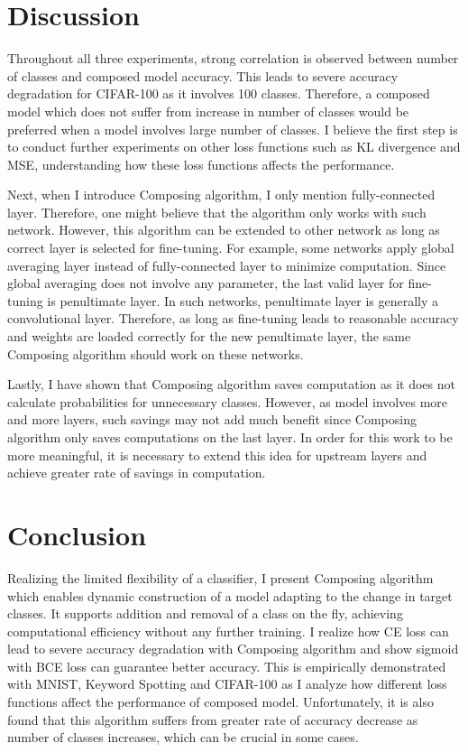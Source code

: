 \documentclass{article}
\begin{document}
\section{Discussion}

Throughout all three experiments, strong correlation is observed between number of classes and composed model accuracy. This leads to severe accuracy degradation for CIFAR-100 as it involves 100 classes. Therefore, a composed model which does not suffer from increase in number of classes would be preferred when a model involves large number of classes. I believe the first step is to conduct further experiments on other loss functions such as KL divergence and MSE, understanding how these loss functions affects the performance.

Next, when I introduce Composing algorithm, I only mention fully-connected layer. Therefore, one might believe that the algorithm only works with such network. However, this algorithm can be extended to other network as long as correct layer is selected for fine-tuning. For example, some networks apply global averaging layer instead of fully-connected layer to minimize computation. Since global averaging does not involve any parameter, the last valid layer for fine-tuning is penultimate layer. In such networks, penultimate layer is generally a convolutional layer. Therefore, as long as fine-tuning leads to reasonable accuracy and weights are loaded correctly for the new penultimate layer, the same Composing algorithm should work on these networks.

Lastly, I have shown that Composing algorithm saves computation as it does not calculate probabilities for unnecessary classes. However, as model involves more and more layers, such savings may not add much benefit since Composing algorithm only saves computations on the last layer. In order for this work to be more meaningful, it is necessary to extend this idea for upstream layers and achieve greater rate of savings in computation.

\section{Conclusion}

Realizing the limited flexibility of a classifier, I present Composing algorithm which enables dynamic construction of a model adapting to the change in target classes. It supports addition and removal of a class on the fly, achieving computational efficiency without any further training. I realize how CE loss can lead to severe accuracy degradation with Composing algorithm and show sigmoid with BCE loss can guarantee better accuracy. This is empirically demonstrated with MNIST, Keyword Spotting and CIFAR-100 as I analyze how different loss functions affect the performance of composed model. Unfortunately, it is also found that this algorithm suffers from greater rate of accuracy decrease as number of classes increases, which can be crucial in some cases.

\newpage

\nocite{*}



\end{document}
